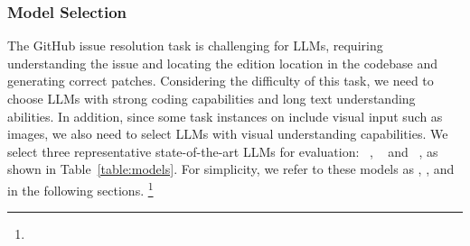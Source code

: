 

\subsubsection{Model Selection}



The GitHub issue resolution task is challenging for LLMs, requiring understanding the issue and locating the edition location in the codebase and generating correct patches. Considering the difficulty of this task,  we need to choose LLMs with strong coding capabilities and long text understanding abilities. In addition, since some task instances on \Swebenchx include visual input such as images, we also need to select LLMs with visual understanding capabilities. We select three representative state-of-the-art LLMs for evaluation: \GPTFullName~\cite{gpt-4o}, \ClaudeFullName~\cite{claude-3-5-sonnet} and \DeepSeekFullName~\cite{deepseekV25}, as shown in Table~\ref{table:models}. For simplicity, we refer to these models as \GPT, \Claude, and \DeepSeek in the following sections. \footnote{}




